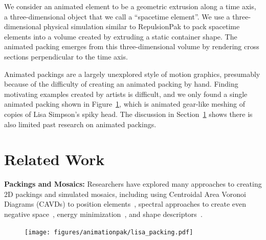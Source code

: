 We consider an animated
element to be a geometric extrusion along a time axis, a three-dimensional
object that we call a ``spacetime element''.  We use a three-dimensional physical simulation
similar to RepulsionPak to pack spacetime
elements into a volume created by extruding a static container shape.
The animated packing emerges from this three-dimensional volume by rendering 
cross sections perpendicular to the time axis.

\newtext
{
Animated packings are a largely unexplored style
of motion graphics, presumably because of the difficulty of creating 
an animated packing by hand.  
Finding motivating examples created by artists is difficult, and
we only found a single animated packing shown in Figure~\ref{fig_animationpak_lisa_packing},
which is animated gear-like meshing of copies of Lisa Simpson's spiky head.
The discussion in Section~\ref{animationpak_previous_work} shows there is also limited past research
on animated packings.
}



\section{Related Work}
\label{animationpak_previous_work}


\textbf{Packings and Mosaics:} 
Researchers have explored many approaches to creating 2D packings and
simulated mosaics, including using Centroidal Area Voronoi Diagrams (CAVDs) to
position elements~\cite{Hausner2001,Hiller2003,Smith2005}, spectral
approaches to create even negative space~\cite{Dalal2006}, energy
minimization~\cite{Kim2002}, and shape descriptors~\cite{Kwan2016}.

\begin{figure}[t]
\centering
\texttt{[image: figures/animationpak/lisa\_packing.pdf]} 
\caption[An animated packing of copies of Lisa Simpson]
{\label{fig_animationpak_lisa_packing} 
}
\end{figure}

